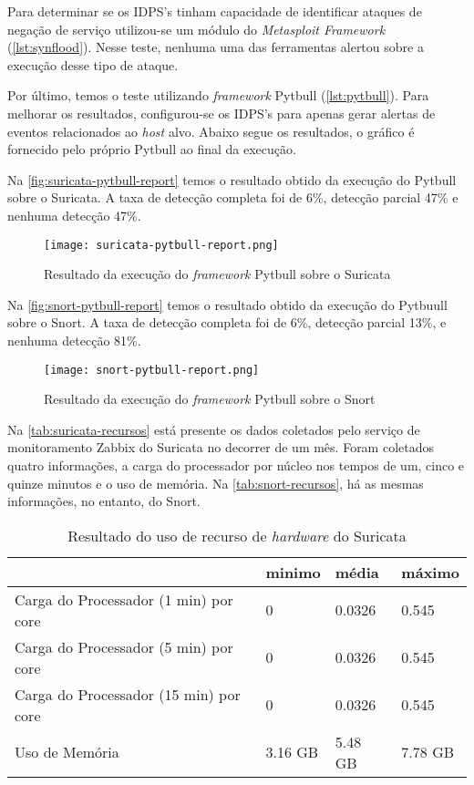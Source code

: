 Para determinar se os IDPS's tinham capacidade de identificar ataques de negação de serviço utilizou-se um módulo do \textit{Metasploit Framework} (\autoref{lst:synflood}). Nesse teste, nenhuma uma das ferramentas alertou sobre a execução desse tipo de ataque. 

Por último, temos o teste utilizando \textit{framework} Pytbull (\autoref{lst:pytbull}). Para melhorar os resultados, configurou-se os IDPS's para apenas gerar alertas de eventos relacionados ao \textit{host} alvo. Abaixo segue os resultados, o gráfico é fornecido pelo próprio Pytbull ao final da execução.

Na \autoref{fig:suricata-pytbull-report} temos o resultado obtido da execução do Pytbull sobre o Suricata. A taxa de detecção completa foi de 6\%, detecção parcial 47\% e nenhuma detecção 47\%.

\begin{figure}[!htb]
\centering
\caption{Resultado da execução do \textit{framework} Pytbull sobre o Suricata}
\texttt{[image: suricata-pytbull-report.png]}
\label{fig:suricata-pytbull-report}
\end{figure}

Na \autoref{fig:snort-pytbull-report} temos o resultado obtido da execução do Pytbuull sobre o Snort. A taxa de detecção completa foi de 6\%, detecção parcial 13\%, e nenhuma detecção 81\%.

\begin{figure}[!htb]
\centering
\caption{Resultado da execução do \textit{framework} Pytbull sobre o Snort}
\texttt{[image: snort-pytbull-report.png]}
\label{fig:snort-pytbull-report}
\end{figure}

Na \autoref{tab:suricata-recursos} está presente os dados coletados pelo serviço de monitoramento Zabbix do Suricata no decorrer de um mês. Foram coletados quatro informações, a carga do processador por núcleo nos tempos de um, cinco e quinze minutos e o uso de memória. Na \autoref{tab:snort-recursos}, há as mesmas informações, no entanto, do Snort.

\begin{table}[!htb]
\ABNTEXfontereduzida
\centering
\caption{Resultado do uso de recurso de \textit{hardware} do Suricata}
\label{tab:suricata-recursos}
\begin{tabular}{|M{5cm}|M{2cm}|M{2cm}|M{2cm}|}
    \hline
     & \textbf{minimo} & \textbf{média} & \textbf{máximo} \\
    \hline
    Carga do Processador (1 min) por core & 0 & 0.0326 & 0.545 \\
    \hline
    Carga do Processador (5 min) por core & 0 & 0.0326 & 0.545 \\
    \hline
    Carga do Processador (15 min) por core & 0 & 0.0326 & 0.545 \\
    \hline
    Uso de Memória & 3.16 GB & 5.48 GB & 7.78 GB \\
    \hline
\end{tabular}
\end{table}

